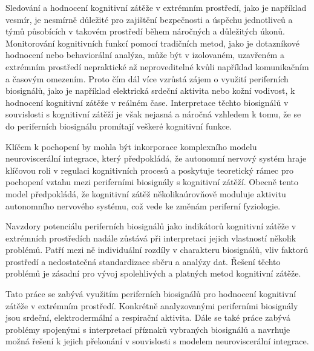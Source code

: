 Sledování a hodnocení kognitivní zátěže v extrémním prostředí, jako je například
vesmír, je nesmírně důležité pro zajištění bezpečnosti a úspěchu jednotlivců a
týmů působících v takovém prostředí během náročných a důležitých úkonů.
Monitorování kognitivních funkcí pomocí tradičních metod, jako je dotazníkové
hodnocení nebo behaviorální analýza, může být v izolovaném, uzavřeném a
extrémním prostředí nepraktické až neproveditelné kvůli například komunikačním a
časovým omezením. Proto čím dál více vzrůstá zájem o využití periferních
biosignálů, jako je například elektrická srdeční aktivita nebo kožní vodivost, k
hodnocení kognitivní zátěže v reálném čase. Interpretace těchto biosignálů v
souvislosti s kognitivní zátěží je však nejasná a náročná vzhledem k tomu, že se
do periferních biosignálu promítají veškeré kognitivní funkce. 

Klíčem k pochopení by mohla být inkorporace komplexního modelu neuroviscerální
integrace, který předpokládá, že autonomní nervový systém hraje klíčovou roli v
regulaci kognitivních procesů a poskytuje teoretický rámec pro pochopení vztahu
mezi periferními biosignály s kognitivní zátěží. Obecně tento model předpokládá,
že kognitivní zátěž několikaúrovňově moduluje aktivitu autonomního nervového
systému, což vede ke změnám periferní fyziologie.

Navzdory potenciálu periferních biosignálů jako indikátorů kognitivní zátěže v
extrémních prostředích nadále zůstává při interpretaci jejich vlastností několik
problémů. Patří mezi ně individuální rozdíly v charakteru biosignálů, vliv
faktorů prostředí a nedostatečná standardizace sběru a analýzy dat. Řešení
těchto problémů je zásadní pro vývoj spolehlivých a platných metod kognitivní
zátěže.

Tato práce se zabývá využitím periferních biosignálů pro hodnocení kognitivní
zátěže v extrémním prostředí. Konkrétně analyzovanými periferními biosignály
jsou srdeční, elektrodermální a respirační aktivita. Dále se také práce zabývá
problémy spojenými s interpretací příznaků vybraných biosignálů a navrhuje možná
řešení k jejich překonání v souvislosti s modelem neuroviscerální integrace.

